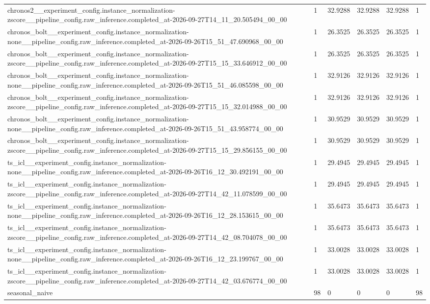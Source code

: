\begin{tabular}{llllll}
chronos2\_\_experiment\_config.instance\_normalization-zscore\_\_pipeline\_config.raw\_inference.completed\_at-2026-09-27T14\_11\_20.505494\_00\_00 & 1 & 32.9288 & 32.9288 & 32.9288 & 1 \\
chronos\_bolt\_\_experiment\_config.instance\_normalization-none\_\_pipeline\_config.raw\_inference.completed\_at-2026-09-26T15\_51\_47.690968\_00\_00 & 1 & 26.3525 & 26.3525 & 26.3525 & 1 \\
chronos\_bolt\_\_experiment\_config.instance\_normalization-zscore\_\_pipeline\_config.raw\_inference.completed\_at-2026-09-27T15\_15\_33.646912\_00\_00 & 1 & 26.3525 & 26.3525 & 26.3525 & 1 \\
chronos\_bolt\_\_experiment\_config.instance\_normalization-none\_\_pipeline\_config.raw\_inference.completed\_at-2026-09-26T15\_51\_46.085598\_00\_00 & 1 & 32.9126 & 32.9126 & 32.9126 & 1 \\
chronos\_bolt\_\_experiment\_config.instance\_normalization-zscore\_\_pipeline\_config.raw\_inference.completed\_at-2026-09-27T15\_15\_32.014988\_00\_00 & 1 & 32.9126 & 32.9126 & 32.9126 & 1 \\
chronos\_bolt\_\_experiment\_config.instance\_normalization-none\_\_pipeline\_config.raw\_inference.completed\_at-2026-09-26T15\_51\_43.958774\_00\_00 & 1 & 30.9529 & 30.9529 & 30.9529 & 1 \\
chronos\_bolt\_\_experiment\_config.instance\_normalization-zscore\_\_pipeline\_config.raw\_inference.completed\_at-2026-09-27T15\_15\_29.856155\_00\_00 & 1 & 30.9529 & 30.9529 & 30.9529 & 1 \\
ts\_icl\_\_experiment\_config.instance\_normalization-none\_\_pipeline\_config.raw\_inference.completed\_at-2026-09-26T16\_12\_30.492191\_00\_00 & 1 & 29.4945 & 29.4945 & 29.4945 & 1 \\
ts\_icl\_\_experiment\_config.instance\_normalization-zscore\_\_pipeline\_config.raw\_inference.completed\_at-2026-09-27T14\_42\_11.078599\_00\_00 & 1 & 29.4945 & 29.4945 & 29.4945 & 1 \\
ts\_icl\_\_experiment\_config.instance\_normalization-none\_\_pipeline\_config.raw\_inference.completed\_at-2026-09-26T16\_12\_28.153615\_00\_00 & 1 & 35.6473 & 35.6473 & 35.6473 & 1 \\
ts\_icl\_\_experiment\_config.instance\_normalization-zscore\_\_pipeline\_config.raw\_inference.completed\_at-2026-09-27T14\_42\_08.704078\_00\_00 & 1 & 35.6473 & 35.6473 & 35.6473 & 1 \\
ts\_icl\_\_experiment\_config.instance\_normalization-none\_\_pipeline\_config.raw\_inference.completed\_at-2026-09-26T16\_12\_23.199767\_00\_00 & 1 & 33.0028 & 33.0028 & 33.0028 & 1 \\
ts\_icl\_\_experiment\_config.instance\_normalization-zscore\_\_pipeline\_config.raw\_inference.completed\_at-2026-09-27T14\_42\_03.676774\_00\_00 & 1 & 33.0028 & 33.0028 & 33.0028 & 1 \\
seasonal\_naive & 98 & 0 & 0 & 0 & 98 \\
\bottomrule
\end{tabular}
